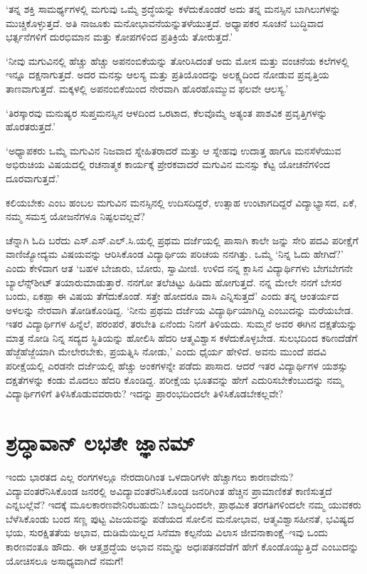 \vskip 4.5pt

‘ತನ್ನ ಶಕ್ತಿ ಸಾಮರ್ಥ್ಯಗಳಲ್ಲಿ ಮಗುವು ಒಮ್ಮೆ ಶ್ರದ್ಧೆಯನ್ನು ಕಳೆದುಕೊಂಡರೆ ಅದು ತನ್ನ ಮನಸ್ಸಿನ ಬಾಗಿಲುಗಳನ್ನು ಮುಚ್ಚಿಕೊಳ್ಳುತ್ತದೆ. ಅತಿ ನಾಜೂಕು ಮನೋಭಾವನೆಯನ್ನು\break ತಳೆಯುತ್ತದೆ. ಅಧ್ಯಾಪಕರ ಸೂಚನೆ ಬುದ್ಧಿವಾದ ಭರ್ತ್ಸನೆಗಳಿಗೆ ದುರಭಿಮಾನ ಮತ್ತು ಕೋಪಗಳಿಂದ ಪ್ರತಿಕ್ರಿಯೆ ತೋರುತ್ತದೆ.’

‘ನೀವು ಮಗುವಿನಲ್ಲಿ ಹೆಚ್ಚು ಹೆಚ್ಚು ಅಪನಂಬಿಕೆಯನ್ನು ತೋರಿಸಿದಂತೆ ಅದು ಮೋಸ ಮತ್ತು ವಂಚನೆಯ ಕಲೆಗಳಲ್ಲಿ ಇನ್ನೂ ದಕ್ಷನಾಗುತ್ತದೆ. ಅದರ ಮನಸ್ಸು ಆಲಸ್ಯ ಮತ್ತು ಪ್ರತಿಯೊಂದನ್ನು ಅಲಕ್ಷ್ಯದಿಂದ ನೋಡುವ ಪ್ರವೃತ್ತಿಯ ತಾಣವಾಗುತ್ತದೆ. ಮಕ್ಕಳಲ್ಲಿ ಅಪನಂಬಿಕೆಯಿಂದ ನೇರವಾಗಿ ಹೊರಹೊಮ್ಮುವ ಫಲವೇ ಆಲಸ್ಯ.’

‘ತಿರಸ್ಕಾರವು ಮನುಷ್ಯರ ಸುಪ್ತಮನಸ್ಸಿನ ಆಳದಿಂದ ಒರಟಾದ, ಕೆಲವೊಮ್ಮೆ ಅತ್ಯಂತ ಪಾಶವಿಕ ಪ್ರವೃತ್ತಿಗಳನ್ನು ಹೊರತರುತ್ತದೆ.’

‘ಅಧ್ಯಾಪಕರು ಒಮ್ಮೆ ಮಗುವಿನ ನಿಜವಾದ ಸ್ನೇಹಿತರಾದರೆ ಮತ್ತು ಆ ಸ್ನೇಹವು ಉದಾತ್ತ ಹಾಗೂ ಮನಸೆಳೆಯುವ ಅಭಿರುಚಿಯ ವಿಷಯದಲ್ಲಿ ರಚನಾತ್ಮಕ ಕಾರ್ಯಕ್ಕೆ ಪ್ರೇರಕವಾದರೆ ಮಗುವಿನ ಮನಸ್ಸು ಕೆಟ್ಟ ಯೋಚನೆಗಳಿಂದ ದೂರವಾಗುತ್ತದೆ.’

ಕಲಿಯಬೇಕು ಎಂಬ ಹಂಬಲ ಮಗುವಿನ ಮನಸ್ಸಿನಲ್ಲಿ ಉದಿಸದಿದ್ದರೆ, ಉತ್ಸಾಹ ಉಂಟಾಗದಿದ್ದರೆ ವಿದ್ಯಾಭ್ಯಾಸದ, ಏಕೆ, ನಮ್ಮ ಸಮಸ್ತ ಯೋಜನೆಗಳೂ ನಿಷ್ಫಲವಲ್ಲವೆ?

ಚೆನ್ನಾಗಿ ಓದಿ ಬರೆದು ಎಸ್.ಎಸ್.ಎಲ್.ಸಿ.ಯಲ್ಲಿ ಪ್ರಥಮ ದರ್ಜೆಯಲ್ಲಿ ಪಾಸಾಗಿ ಕಾಲೇ ಜನ್ನು ಸೇರಿ ಪದವಿ ಪರೀಕ್ಷೆಗೆ ವಾಣಿಜ್ಯೋದ್ಯಮ ವಿಷಯವನ್ನು ಆರಿಸಿಕೊಂಡ ವಿದ್ಯಾರ್ಥಿಯ ಪರಿಚಯ ನನಗಿತ್ತು. ಒಮ್ಮೆ ‘ನಿನ್ನ ಓದು ಹೇಗಿದೆ?’ ಎಂದು ಕೇಳಿದಾಗ ಆತ ‘ಬಹಳ ಬೇಜಾರು, ಬೋರು, ಸ್ವಾಮೀಜಿ. ಉಳಿದ ನನ್ನ ಕ್ಲಾಸಿನ ವಿದ್ಯಾರ್ಥಿಗಳು ಬೇಗಬೇಗನೇ ಬ್ಯಾಲೆನ್ಸ್​ಶೀಟ್ ತಯಾರುಮಾಡುತ್ತಾರೆ. ನನಗೋ ತಲೆಚಿಟ್ಟು ಹಿಡಿದು ಹೋಗುತ್ತದೆ. ನನ್ನ ಮೇಲೇ ನನಗೆ ಬೇಸರ ಬಂದು, ಏಕಪ್ಪಾ ಈ ವಿಷಯ ತೆಗೆದುಕೊಂಡೆ. ಸತ್ತೇ ಹೋದರೂ ವಾಸಿ ಎನ್ನಿಸುತ್ತದೆ’ ಎಂದು ತನ್ನ ಆಂತರ್ಯದ ಅಳಲನ್ನು ನೇರವಾಗಿ ತೋಡಿಕೊಂಡಿದ್ದ. ‘ನೀನು ಪ್ರಥಮ ದರ್ಜೆಯ ವಿದ್ಯಾರ್ಥಿಯಾಗಿದ್ದಿ ಎಂಬುದನ್ನು ಮರೆಯಬೇಡ. ಇತರ ವಿದ್ಯಾರ್ಥಿಗಳ ಹಿನ್ನೆಲೆ, ಪರಂಪರೆ, ತರಬೇತಿ ಏನೆಂದು ನಿನಗೆ ತಿಳಿಯದು. ಸುಮ್ಮನೆ ಅವರ ಈಗಿನ ದಕ್ಷತೆಯನ್ನು ಮಾತ್ರ ನೋಡಿ ನಿನ್ನ ಸದ್ಯದ ಸ್ಥಿತಿಯನ್ನು ಹೋಲಿಸಿ ಹೆದರಿ ಆತ್ಮವಿಶ್ವಾಸ ಕಳೆದುಕೊಳ್ಳಬೇಡ. ಸುಲಭದಿಂದ ಕಠಿಣದೆಡೆಗೆ ಹೆಜ್ಜೆಹೆಜ್ಜೆಯಾಗಿ ಮೇಲೇರಬೇಕು, ಪ್ರಯತ್ನಿಸಿ ನೋಡು,’ ಎಂದು ಧೈರ್ಯ ಹೇಳಿದೆ. ಅವನು ಮುಂದೆ ಪದವಿ ಪರೀಕ್ಷೆಯಲ್ಲಿ ಎರಡನೇ ದರ್ಜೆಯಲ್ಲಿ ಹೆಚ್ಚು ಅಂಕಗಳನ್ನೇ ಪಡೆದು ಪಾಸಾದ. ಆದರೆ ಇತರ ವಿದ್ಯಾರ್ಥಿಗಳ ಯಶಸ್ಸು ದಕ್ಷತೆಗಳನ್ನು ಕಂಡು ಮೊದಲು ಹೆದರಿ ಕೊಂಡಿದ್ದ. ಪರೀಕ್ಷೆಯ ಭೂತವನ್ನು ಹೇಗೆ ಎದುರಿಸಬೇಕೆಂಬುದನ್ನು ನಮ್ಮ ವಿದ್ಯಾರ್ಥಿಗಳಿಗೆ ತಿಳಿಸಿಕೊಡುವವರಾರು? ಇದನ್ನು ಪ್ರಾರಂಭದಿಂದಲೇ ತಿಳಿಸಿಕೊಡಬೇಕಲ್ಲವೇ?


\section*{ಶ್ರದ್ಧಾವಾನ್ ಲಭತೇ ಜ್ಞಾನಮ್​}


ಇಂದು ಭಾರತದ ಎಲ್ಲ ರಂಗಗಳಲ್ಲೂ ನೇರದಾರಿಗಿಂತ ಒಳದಾರಿಗಳೇ ಹೆಚ್ಚಾಗಲು ಕಾರಣವೇನು? ವಿದ್ಯಾವಂತರೆನಿಸಿಕೊಂಡ ಜನರಲ್ಲಿ ಅವಿದ್ಯಾವಂತರೆನಿಸಿಕೊಂಡ ಜನರಿಗಿಂತ ಹೆಚ್ಚಿನ ಪ್ರಾಮಾಣಿಕತೆ ಕಾಣಿಸುತ್ತದೆ ಎನ್ನಬಲ್ಲೆವೆ? ಇದಕ್ಕೆ ಮೂಲಕಾರಣವೇನಿರಬಹುದು? ಬಾಲ್ಯದಿಂದಲೇ, ಪ್ರಾಥಮಿಕ ತರಗತಿಗಳಿಂದಲೇ ನಮ್ಮ ಯುವಕರು ಬೆಳೆಸಿಕೊಂಡು ಬಂದ ಸಣ್ಣ ಪುಟ್ಟ ವಿಜಯವನ್ನು ಪಡೆಯದ ಸೋಲಿನ ಮನೋಭಾವ, ಆತ್ಮವಿಶ್ವಾಸಹೀನತೆ, ಭವಿಷ್ಯದ ಭಯ, ಸುರಕ್ಷಿತತೆಯ ಅಭಾವ, ದುಡಿಮೆಯಿಲ್ಲದ ಸಿನೆಮಾ ಕಲ್ಪನೆಯ ವಿಲಾಸ ಜೀವನಾಕಾಂಕ್ಷೆ–ಇವು ಒಂದು ಕಾರಣವಂತೂ ಹೌದು. ಈ ಆತ್ಮಶ್ರದ್ಧೆಯ ಅಭಾವ ನಮ್ಮನ್ನು ಅಧಃಪತನದೆಡೆಗೆ ಹೇಗೆ ಕೊಂಡೊಯ್ಯುತ್ತಿದೆ ಎಂಬುದನ್ನು ಯೋಚಿಸಲೂ ಅಸಾಧ್ಯವಾಗಿದೆ ನಮಗೆ!


